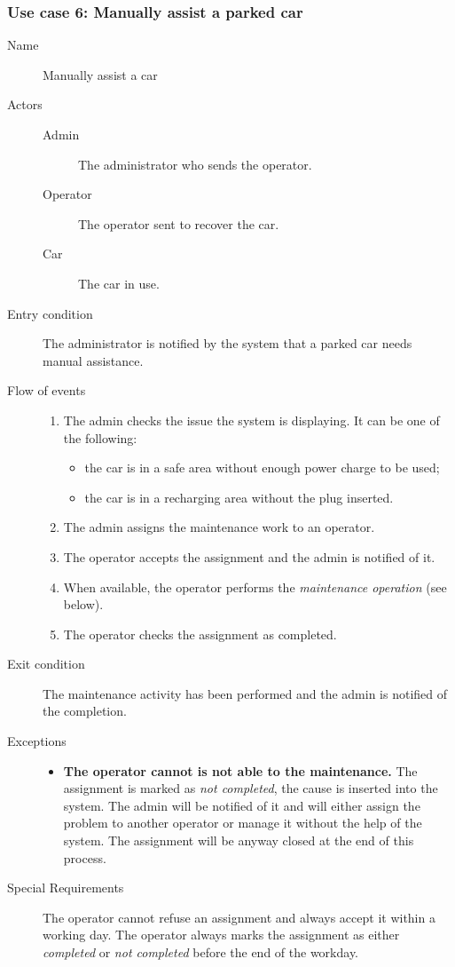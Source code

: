 	\subsubsection{Use case 6: Manually assist a parked car}
	\begin{description}
		\item[Name] Manually assist a car
		\item[Actors] \hfill
			\begin{description}
				\item[Admin] The administrator who sends the operator.
				\item[Operator] The operator sent to recover the car.
				\item[Car] The car in use.
			\end{description}
		\item[Entry condition] The administrator is notified by the system that a parked car needs manual assistance.
		\item[Flow of events] \hfill
			\begin{enumerate}
				\item The admin checks the issue the system is displaying. It can be one of the following:
					\begin{itemize}
						\item the car is in a safe area without enough power charge to be used;
						\item the car is in a recharging area without the plug inserted.
					\end{itemize}
				\item The admin assigns the maintenance work to an operator.
				\item The operator accepts the assignment and the admin is notified of it.
				\item When available, the operator performs the \textit{maintenance operation} (see below).
				\item The operator checks the assignment as completed.
			\end{enumerate}
		\item[Exit condition] The maintenance activity has been performed and the admin is notified of the completion.
		\item[Exceptions] \hfill
			\begin{itemize}
				\item \textbf{The operator cannot is not able to the maintenance.} The assignment is marked as \textit{not completed}, the cause is inserted into the system. The admin will be notified of it and will either assign the problem to another operator or manage it without the help of the system. The assignment will be anyway closed at the end of this process.
			\end{itemize}
		\item[Special Requirements] The operator cannot refuse an assignment and always accept it within a working day. %
		The operator always marks the assignment as either \textit{completed} or \textit{not completed} before the end of the workday.
	\end{description}
